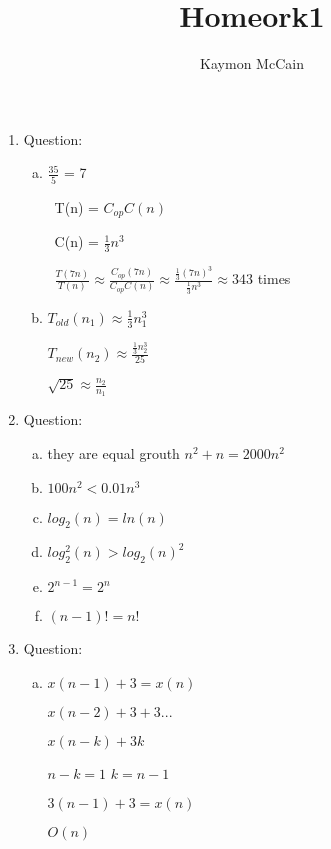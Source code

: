 \documentclass{article}
\title{Homeork1}
\author{Kaymon McCain}
\begin{document}
\maketitle

\begin{enumerate}
  \item Question:
  \begin{enumerate}[(a)]
    \item $\frac{35}{5}$ = 7

    \ T(n) = $C_{op}C(n)$

    \ C(n) = $\frac{1}{3}n^3$

    \  $\frac{T(7n)}{T(n)} \approx \frac{C_{op}(7n)}{C_{op}C(n)} \approx \frac{\frac{1}{3}(7n)^3}{\frac{1}{3}n^3} \approx 343$ times

    \item
    $T_{old}(n_{1}) \approx \frac{1}{3}n_{1}^3$

    $T_{new}(n_{2}) \approx \frac{\frac{1}{3}n_{2}^3}{25}$

    $\sqrt{25} \approx \frac{n_{2}}{n_{1}}$

  \end{enumerate}

  \item Question:
  \begin{enumerate}[(a)]
    \item they are equal grouth $n^2+n = 2000n^2$

    \item $100n^2<0.01n^3$

    \item $log_{2}(n) = ln(n)$

    \item $log_{2}^{2}(n)>log_{2}(n)^2$

    \item $2^{n-1} = 2^n$

    \item $(n-1)! =n!$

  \end{enumerate}
  \item Question:
  \begin{enumerate}[(a)]
    \item $x(n-1)+3=x(n)$

          $x(n-2)+3+3...$

          $x(n-k)+3k$

          $n-k=1$ $k=n-1$

          $3(n-1)+3=x(n)$

          $O(n)$


\end{enumerate}
\end{enumerate}
\end{document}
